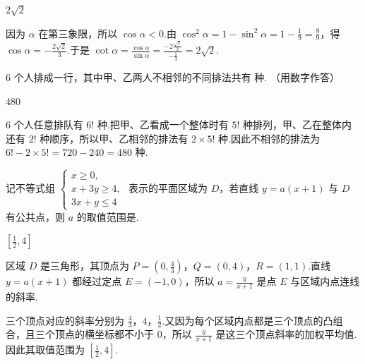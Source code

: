 \begin{answer}
\(2\sqrt{2}\)
\end{answer}

\begin{solution}
因为 \(\alpha\) 在第三象限，所以 \(\cos\alpha<0\).由 \(\cos^2\alpha=1-\sin^2\alpha=1-\frac{1}{9}=\frac{8}{9}\)，得 \(\cos\alpha=-\frac{2\sqrt2}{3}\).于是 \(\cot\alpha=\frac{\cos\alpha}{\sin\alpha}=\frac{-2\frac{\sqrt2}{3}}{-\frac{1}{3}}=2\sqrt2\).
\end{solution}

\begin{problem}
\(6\) 个人排成一行，其中甲、乙两人不相邻的不同排法共有\fillinblank{} 种. （用数字作答）
\end{problem}

\begin{answer}
480
\end{answer}

\begin{solution}
\(6\) 个人任意排队有 \(6!\) 种.把甲、乙看成一个整体时有 \(5!\) 种排列，甲、乙在整体内还有 \(2!\) 种顺序，所以甲、乙相邻的排法有 \(2\times5!\) 种.因此不相邻的排法为 \(6!-2\times5!=720-240=480\) 种.
\end{solution}

\begin{problem}
记不等式组 \(\begin{cases}
x\geqslant0,\\
x+3y\geqslant4,\\
3x+y\leqslant4
\end{cases}\) 表示的平面区域为 \(D\)，若直线 \(y=a(x+1)\) 与 \(D\) 有公共点，则 \(a\) 的取值范围是\fillinblank{}.
\end{problem}

\begin{answer}
\(\left[\frac{1}{2},4\right]\)
\end{answer}

\begin{solution}
区域 \(D\) 是三角形，其顶点为 \(P=\left(0,\frac{4}{3}\right)\)，\(Q=(0,4)\)，\(R=(1,1)\).直线 \(y=a(x+1)\) 都经过定点 \(E=(-1,0)\)，所以 \(a=\frac{y}{x+1}\) 是点 \(E\) 与区域内点连线的斜率.

三个顶点对应的斜率分别为 \(\frac{4}{3}\)，\(4\)，\(\frac{1}{2}\).又因为每个区域内点都是三个顶点的凸组合，且三个顶点的横坐标都不小于 \(0\)，所以 \(\frac{y}{x+1}\) 是这三个顶点斜率的加权平均值.因此其取值范围为 \(\left[\frac{1}{2},4\right]\).
\end{solution}

